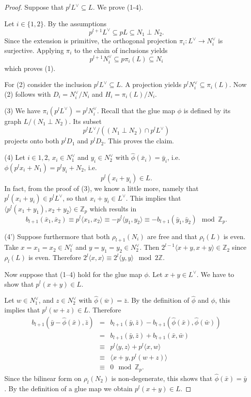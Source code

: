 \documentclass[a4paper]{amsart}
\theoremstyle{definition}
\theoremstyle{plain}
\newcommand{\ZZ}{\mathbb{Z}}
\newcommand{\sprodb}[2]{\langle #1, #2 \rangle}
\newcommand{\sprodbq}[1]{\langle #1, #1 \rangle}
\begin{document}
\begin{proof}
Suppose that $p^l L^\vee \subseteq L$. We prove (1-4).

Let $i \in\{1,2\}$. By the assumptions
\[p^{l+1} L^\vee \subseteq p L \subseteq N_1 \perp N_2.\]
Since the extension is primitive, the orthogonal projection $\pi_i \colon L^\vee \rightarrow N_i^\vee$ is surjective. Applying $\pi_i$ to the chain of inclusions yields
\[p^{l+1} N_i^\vee \subseteq p \pi_i(L) \subseteq N_i\]
which proves (1).

For (2) consider the inclusion $p^lL^\vee \subseteq L$.
A projection yields $p^l N_i^\vee \subseteq \pi_i(L)$. Now (2) follows with $D_i = N_i^\vee / N_i$ and  $H_i = \pi_i(L)/N_i$.

(3) We have $\pi_i(p^l L^\vee) =  p^l N_i^\vee$.
Recall that the glue map $\phi$ is defined by its graph $L/(N_1 \perp N_2)$.
Its subset
\[p^l L^\vee / ((N_1 \perp N_2) \cap p^lL^\vee)\]
projects onto both $p^l D_1$ and $p^l D_2$. This proves the claim.

(4) Let $i\in{1,2}$, $x_i \in N_1^\vee$ and $y_i \in N_2^\vee$ with $\hat \phi(\bar x_i) = \bar y_i$, i.e. $\phi(p^l x_i + N_1) = p^l y_i + N_2$, i.e.
\[p^l(x_i+y_i) \in L.\]
In fact, from the proof of (3), we know a little more, namely that $p^l(x_i+y_i) \in p^l L^\vee$, so that $x_i+y_i \in L^\vee$.
This implies that $\sprodb{p^l(x_1+y_1)}{x_2+y_2} \in \ZZ_p$ which results in
\[b_{l+1}(\bar x_1, \bar x_2) \equiv p^{l}\sprodb{x_1}{x_2} \equiv - p^{l}\sprodb{y_1}{y_2} \equiv - b_{l+1}(\bar y_1, \bar y_2) \mod \ZZ_p.\]

(4') Suppose furthermore that both $\rho_{l+1}(N_i)$ are free and that $\rho_l(L)$ is even. Take $x=x_1=x_2 \in N_1^\vee$ and $y=y_1=y_2 \in N_2^\vee$.
Then $2^{l-1}\sprodbq{x+y}{} \in  \ZZ_2$ since $\rho_{l}(L)$ is even.
Therefore $2^{l}\sprodbq{x}{} \equiv 2^l\sprodbq{y}{} \mod 2 \ZZ$.

Now suppose that (1--4) hold for the glue map $\phi$.
Let $x + y \in L^\vee$. We have to show that $p^l(x+y) \in L$.

Let $w \in N_1^\vee$, and $z \in N_2^\vee$ with $\hat \phi( \bar w )=\bar z$.
By the definition of $\hat \phi$ and $\phi$, this implies that $p^l(w+z) \in L$. Therefore
\begin{eqnarray*}
b_{l+1}(\bar y - \hat \phi(\bar x),\bar z)
&= &b_{l+1}( \bar y, \bar z) - b_{l+1}(\hat \phi (\bar x), \hat \phi(\bar w))\\
&=&b_{l+1}( \bar y, \bar z) + b_{l+1}(\bar x, \bar w)\\
&\equiv& p^l\sprodb{y}{ z} + p^{l}\sprodb{x}{w} \\
&\equiv & \sprodb{x+y}{p^l(w+z)}\\
&\equiv& 0 \mod \ZZ_p.
\end{eqnarray*}
Since the bilinear form on $\rho_l(N_2)$ is non-degenerate, this shows that
$\hat \phi(\bar x)=\bar y$. By the definition of a glue map we obtain $p^l(x+y) \in L$.


\end{proof}
\end{document}
